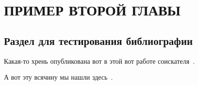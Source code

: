 \chapter{ПРИМЕР ВТОРОЙ ГЛАВЫ}
\section{Раздел для тестирования библиографии}

Какая-то хрень опубликована вот в этой вот работе соискателя~\cite{public_001}.

А вот эту всячину мы нашли здесь~\cite{math_rand_001,rail_book_aizinbud}.